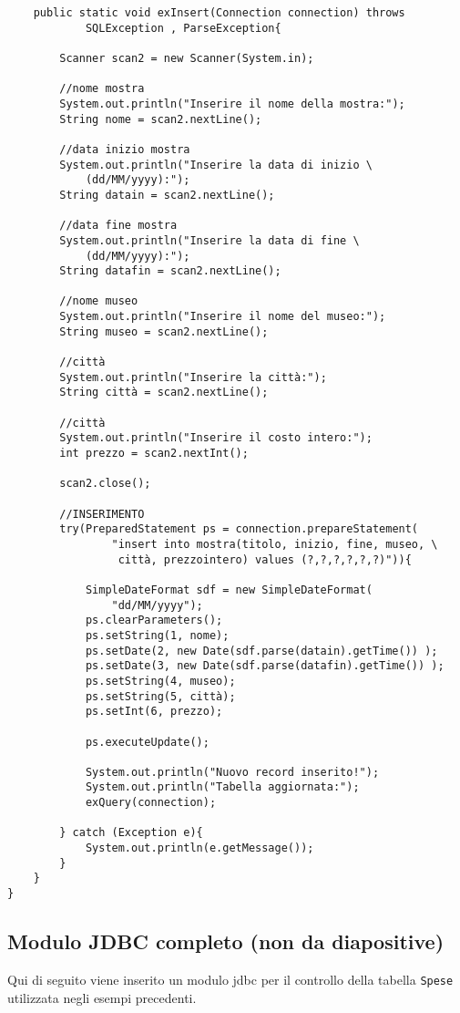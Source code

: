 \documentclass[a4paper, 10pt, titlepage]{article}
\begin{document}
\begin{lstlisting}
    public static void exInsert(Connection connection) throws
    		SQLException , ParseException{

        Scanner scan2 = new Scanner(System.in);

        //nome mostra
        System.out.println("Inserire il nome della mostra:");
        String nome = scan2.nextLine();

        //data inizio mostra
        System.out.println("Inserire la data di inizio \
        	(dd/MM/yyyy):");
        String datain = scan2.nextLine();

        //data fine mostra
        System.out.println("Inserire la data di fine \
        	(dd/MM/yyyy):");
        String datafin = scan2.nextLine();

        //nome museo
        System.out.println("Inserire il nome del museo:");
        String museo = scan2.nextLine();

        //città
        System.out.println("Inserire la città:");
        String città = scan2.nextLine();

        //città
        System.out.println("Inserire il costo intero:");
        int prezzo = scan2.nextInt();

        scan2.close();
        
        //INSERIMENTO               
        try(PreparedStatement ps = connection.prepareStatement(
                "insert into mostra(titolo, inizio, fine, museo, \
                 città, prezzointero) values (?,?,?,?,?,?)")){
                 
            SimpleDateFormat sdf = new SimpleDateFormat(
            	"dd/MM/yyyy");
            ps.clearParameters();
            ps.setString(1, nome);
            ps.setDate(2, new Date(sdf.parse(datain).getTime()) );
            ps.setDate(3, new Date(sdf.parse(datafin).getTime()) );
            ps.setString(4, museo);
            ps.setString(5, città);
            ps.setInt(6, prezzo);
            
            ps.executeUpdate();	

            System.out.println("Nuovo record inserito!");
            System.out.println("Tabella aggiornata:");
            exQuery(connection);
            
        } catch (Exception e){
            System.out.println(e.getMessage());
        }
    }
}
\end{lstlisting}


\subsection*{Modulo JDBC completo (non da diapositive)}
Qui di seguito viene inserito un modulo jdbc per il controllo della tabella \lstinline|Spese| utilizzata negli esempi precedenti.
\end{document}
